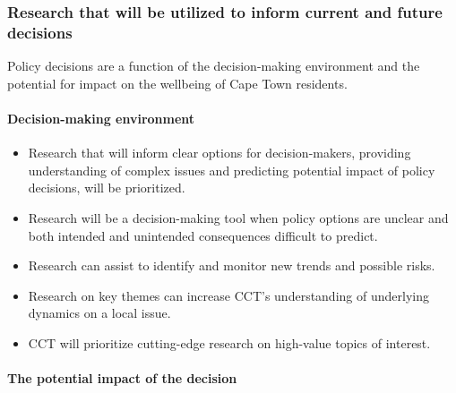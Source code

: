 \hypertarget{research-that-will-be-utilized-to-inform-current-and-future-decisions}{%
\subsubsection*{Research that will be utilized to inform current and future decisions}\label{research-that-will-be-utilized-to-inform-current-and-future-decisions}}

Policy decisions are a function of the decision-making environment and the potential for impact on the wellbeing of Cape Town residents.

\hypertarget{decision-making-environment}{%
\paragraph{Decision-making environment}\label{decision-making-environment}}

\begin{itemize}
\tightlist
\item
  Research that will inform clear options for decision-makers, providing understanding of complex issues and predicting potential impact of policy decisions, will be prioritized.
\item
  Research will be a decision-making tool when policy options are unclear and both intended and unintended consequences difficult to predict.
\item
  Research can assist to identify and monitor new trends and possible risks.
\item
  Research on key themes can increase CCT's understanding of underlying dynamics on a local issue.
\item
  CCT will prioritize cutting-edge research on high-value topics of interest.
\end{itemize}

\hypertarget{the-potential-impact-of-the-decision}{%
\paragraph{The potential impact of the decision}\label{the-potential-impact-of-the-decision}}

